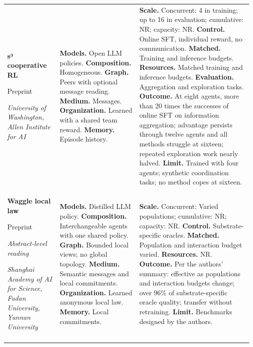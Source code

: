 \begin{longtable}{@{}>{\raggedright\arraybackslash}p{}>{\raggedright\arraybackslash}p{}>{\raggedright\arraybackslash}p{}@{}}
\textbf{s³ cooperative RL}\par \citep{s3-swarm-scaling}\par Preprint\par\emph{University of Washington, Allen Institute for AI} & \textbf{Models.} Open LLM policies. \textbf{Composition.} Homogeneous. \textbf{Graph.} Peers with optional message reading. \textbf{Medium.} Messages. \textbf{Organization.} Learned with a shared team reward. \textbf{Memory.} Episode history. & \textbf{Scale.} Concurrent: 4 in training; up to 16 in evaluation; cumulative: NR; capacity: NR. \textbf{Control.} Online SFT, individual reward, no communication. \textbf{Matched.} Training and inference budgets. \textbf{Resources.} Matched training and inference budgets. \textbf{Evaluation.} Aggregation and exploration tasks. \textbf{Outcome.} At eight agents, more than 20 times the successes of online SFT on information aggregation; advantage persists through twelve agents and all methods struggle at sixteen; repeated exploration work nearly halved. \textbf{Limit.} Trained with four agents; synthetic coordination tasks; no method copes at sixteen. \\ \addlinespace[5pt]
\textbf{Waggle local law}\par \citep{waggle-2026}\par Preprint\par\emph{Abstract-level reading}\par\emph{Shanghai Academy of AI for Science, Fudan University, Yunnan University} & \textbf{Models.} Distilled LLM policy. \textbf{Composition.} Interchangeable agents with one shared policy. \textbf{Graph.} Bounded local views; no global topology. \textbf{Medium.} Semantic messages and local commitments. \textbf{Organization.} Learned anonymous local law. \textbf{Memory.} Local commitments. & \textbf{Scale.} Concurrent: Varied populations; cumulative: NR; capacity: NR. \textbf{Control.} Substrate-specific oracles. \textbf{Matched.} Population and interaction budget varied. \textbf{Resources.} NR. \textbf{Outcome.} Per the authors’ summary: effective as populations and interaction budgets change; over 96\% of substrate-specific oracle quality; transfer without retraining. \textbf{Limit.} Benchmarks designed by the authors. \\ \addlinespace[5pt]

\end{longtable}
